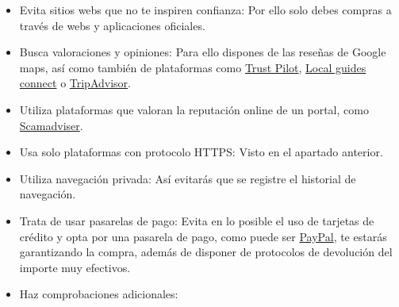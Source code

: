 \documentclass[
  spanish,
  a4paper,
  openany]{book}
\begin{document}
\begin{itemize}
\item
  Evita sitios webs que no te inspiren confianza: Por ello solo debes compras a través de webs y aplicaciones oficiales.
\item
  Busca valoraciones y opiniones: Para ello dispones de las reseñas de Google maps, así como también de plataformas como \href{https://es.trustpilot.com/}{Trust Pilot}, \href{https://www.localguidesconnect.com/}{Local guides connect} o \href{https://www.tripadvisor.es/}{TripAdvisor}.
\item
  Utiliza plataformas que valoran la reputación online de un portal, como \href{https://www.scamadviser.com/}{Scamadviser}.
\item
  Usa solo plataformas con protocolo HTTPS: Visto en el apartado anterior.
\item
  Utiliza navegación privada: Así evitarás que se registre el historial de navegación.
\item
  Trata de usar pasarelas de pago: Evita en lo posible el uso de tarjetas de crédito y opta por una pasarela de pago, como puede ser \href{https://www.paypal.com/es/home}{PayPal}, te estarás garantizando la compra, además de disponer de protocolos de devolución del importe muy efectivos.
\item
  Haz comprobaciones adicionales:


\end{itemize}
\end{document}
